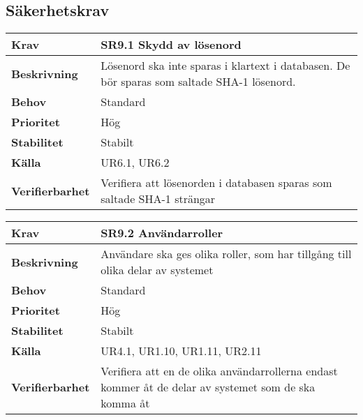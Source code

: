 \documentclass[a4paper, twoside, 11pt, titlepage]{article}
\begin{document}
	\subsection{Säkerhetskrav}


	\begin {table} [ht] \begin{tabular} { p{2.6cm} p{12.5cm} }
		\hline
		\sffamily\textbf{Krav} & \sffamily\textbf{SR9.1 Skydd av lösenord } \\
		\hline
		\sffamily\textbf{Beskrivning} & Lösenord ska inte sparas i klartext i databasen. De bör sparas som saltade SHA-1 lösenord.  \\
		\hline
		\sffamily\textbf{Behov} & Standard  \\
		\hline
		\sffamily\textbf{Prioritet} & Hög  \\
		\hline
		\sffamily\textbf{Stabilitet} & Stabilt  \\
		\hline
		\sffamily\textbf{Källa} & UR6.1, UR6.2  \\
		\hline
		\sffamily\textbf{Verifierbarhet} & Verifiera att lösenorden i databasen sparas som saltade SHA-1 strängar  \\
		\hline
	\end{tabular} \end{table} \FloatBarrier
	\vspace{6mm}

	\begin {table} [ht] \begin{tabular} { p{2.6cm} p{12.5cm} }
		\hline
		\sffamily\textbf{Krav} & \sffamily\textbf{SR9.2 Användarroller } \\
		\hline
		\sffamily\textbf{Beskrivning} & Användare ska ges olika roller, som har tillgång till olika delar av systemet  \\
		\hline
		\sffamily\textbf{Behov} & Standard  \\
		\hline
		\sffamily\textbf{Prioritet} & Hög  \\
		\hline
		\sffamily\textbf{Stabilitet} & Stabilt  \\
		\hline
		\sffamily\textbf{Källa} & UR4.1, UR1.10, UR1.11, UR2.11  \\
		\hline
		\sffamily\textbf{Verifierbarhet} & Verifiera att en de olika användarrollerna endast kommer åt de delar av systemet som de ska komma åt  \\
		\hline
	\end{tabular} \end{table} \FloatBarrier
	\vspace{6mm}
\end{document}
